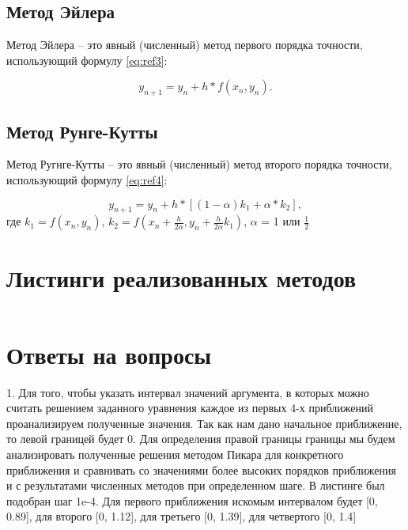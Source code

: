 \documentclass[12pt]{report}
\begin{document}
\section{Метод Эйлера}
Метод Эйлера -- это явный (численный) метод первого порядка точности, использующий формулу \ref{eq:ref3}:

\begin{equation}
	y_{n+1} = y_n + h*f(x_n, y_n).
	\label{eq:ref3}
\end{equation}


\section{Метод Рунге-Кутты}

Метод Ругнге-Кутты -- это явный (численный) метод второго порядка точности, использующий формулу \ref{eq:ref4}:


\begin{equation}
	y_{n+1} = y_n + h*[(1-\alpha)k_1 + \alpha * k_2],
	\label{eq:ref4}
\end{equation}
где $k_1 = f(x_n, y_n)$, $k_2 = f(x_n + \frac{h}{2\alpha}, y_n + \frac{h}{2\alpha}k_1)$, $\alpha$ = 1 или $\frac{1}{2}$
 



\chapter{Листинги реализованных методов}

\begin{lstlisting}[language=Python]
\end{lstlisting}


\chapter{Ответы на вопросы}


1. Для того, чтобы указать интервал значений аргумента, 
в которых можно считать решением заданного
уравнения каждое из первых 4-х приближений проанализируем
полученные значения.
Так как нам дано начальное приближение, то левой границей будет 0.
Для определения правой границы границы мы будем анализировать полученные
решения методом Пикара для конкретного приближения и сравнивать со значениями 
более высоких порядков приближения и с результатами численных методов при 
определенном шаге. В листинге был подобран шаг 1e-4.
Для первого приближения искомым интервалом будет [0, 0.89], 
для второго [0, 1.12], для третьего  [0, 1.39], для четвертого [0, 1.4]
\end{document}
